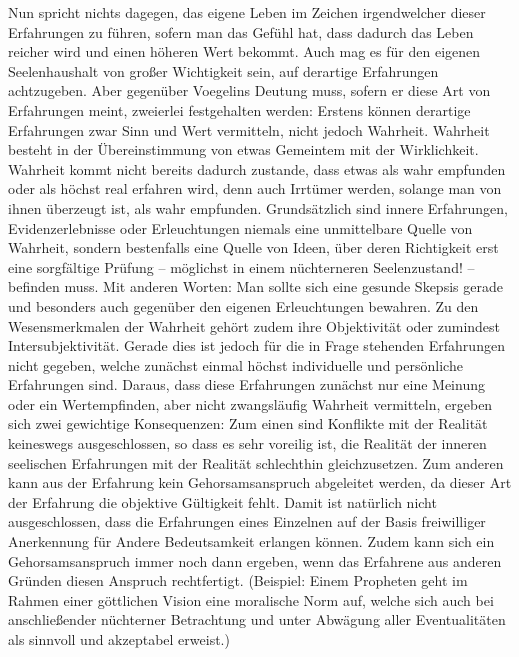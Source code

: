 Nun spricht nichts dagegen, das eigene Leben im Zeichen irgendwelcher dieser
Erfahrungen zu führen, sofern man das Gefühl hat, dass dadurch das Leben
reicher wird und einen höheren Wert bekommt. Auch mag es für den eigenen
Seelenhaushalt von großer Wichtigkeit sein, auf derartige Erfahrungen
achtzugeben.  Aber gegenüber Voegelins Deutung muss, sofern er diese Art von
Erfahrungen meint, zweierlei festgehalten werden: Erstens können derartige
Erfahrungen zwar Sinn und Wert vermitteln, nicht jedoch Wahrheit. Wahrheit
besteht in der Übereinstimmung von etwas Gemeintem mit der Wirklichkeit.
Wahrheit kommt nicht bereits dadurch zustande, dass etwas als wahr empfunden
oder als höchst real erfahren wird, denn auch Irrtümer werden, solange man von
ihnen überzeugt ist, als wahr empfunden. Grundsätzlich sind innere
Erfahrungen, Evidenzerlebnisse oder Erleuchtungen niemals eine unmittelbare
Quelle von Wahrheit, sondern bestenfalls eine Quelle von Ideen, über deren
Richtigkeit erst eine sorgfältige Prüfung -- möglichst in einem nüchterneren
Seelenzustand! -- befinden muss. Mit anderen Worten: Man sollte sich eine
gesunde Skepsis gerade und besonders auch gegenüber den eigenen Erleuchtungen
bewahren. Zu den Wesensmerkmalen der Wahrheit gehört zudem ihre Objektivität
oder zumindest Intersubjektivität.  Gerade dies ist jedoch für die in Frage
stehenden Erfahrungen nicht gegeben, welche zunächst einmal höchst
individuelle und persönliche Erfahrungen sind.  Daraus, dass diese Erfahrungen
zunächst nur eine Meinung oder ein Wertempfinden, aber nicht zwangsläufig
Wahrheit vermitteln, ergeben sich zwei gewichtige Konsequenzen: Zum einen sind
Konflikte mit der Realität keineswegs ausgeschlossen, so dass es sehr voreilig
ist, die Realität der inneren seelischen Erfahrungen mit der Realität
schlechthin gleichzusetzen.  Zum anderen kann aus der Erfahrung kein
Gehorsamsanspruch abgeleitet werden, da dieser Art der Erfahrung die objektive
Gültigkeit fehlt.  Damit ist natürlich nicht ausgeschlossen, dass die
Erfahrungen eines Einzelnen auf der Basis freiwilliger Anerkennung für Andere
Bedeutsamkeit erlangen können. Zudem kann sich ein Gehorsamsanspruch immer
noch dann ergeben, wenn das Erfahrene aus anderen Gründen diesen Anspruch
rechtfertigt. (Beispiel: Einem Propheten geht im Rahmen einer göttlichen
Vision eine moralische Norm auf, welche sich auch bei anschließender
nüchterner Betrachtung und unter Abwägung aller Eventualitäten als sinnvoll
und akzeptabel erweist.)
  
